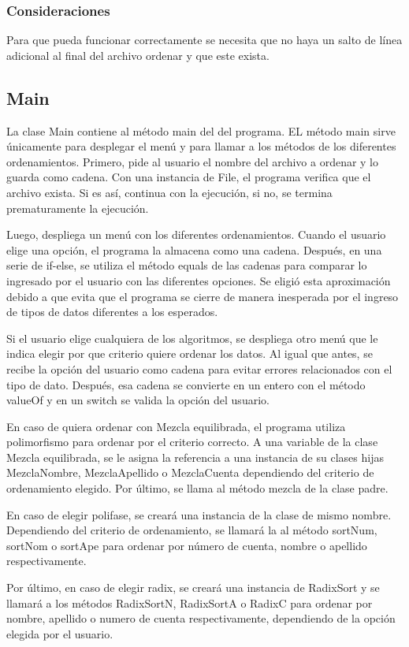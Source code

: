 \documentclass[11pt]{article}
\begin{document}
\subsubsection{Consideraciones}
Para que pueda funcionar correctamente se necesita que no haya un salto de línea adicional al final del archivo ordenar y que este exista. 

\subsection{Main}
La clase Main contiene al método main del del programa. EL método main sirve únicamente para desplegar el menú y para llamar a los métodos de los diferentes ordenamientos. Primero, pide al usuario el nombre del archivo a ordenar y lo guarda como cadena. Con una instancia de File, el programa verifica que el archivo exista. Si es así, continua con la ejecución, si no, se termina prematuramente la ejecución.

 Luego, despliega un menú con los diferentes ordenamientos. Cuando el usuario elige una opción, el programa la almacena como una cadena. Después, en una serie de if-else, se utiliza el método equals de las cadenas para comparar lo ingresado por el usuario con las diferentes opciones. Se eligió esta aproximación debido a que evita que el programa se cierre de manera inesperada por el ingreso de tipos de datos diferentes a los esperados.
\par
Si el usuario elige cualquiera de los algoritmos, se despliega otro menú que le indica elegir por que criterio quiere ordenar los datos. Al igual que antes, se recibe la opción del usuario como cadena para evitar errores relacionados con el tipo de dato. Después, esa cadena se convierte en un entero con el método valueOf y en un switch se valida la opción del usuario. 
\par
En caso de quiera ordenar con Mezcla equilibrada, el programa utiliza polimorfismo para ordenar por el criterio correcto. A una variable de la clase Mezcla equilibrada, se le asigna la referencia a una instancia de su clases hijas MezclaNombre, MezclaApellido o MezclaCuenta dependiendo del criterio de ordenamiento elegido. Por último, se llama al método mezcla de la clase padre.
\par
En caso de elegir polifase, se creará una instancia de la clase de mismo nombre. Dependiendo del criterio de ordenamiento, se llamará la al método sortNum, sortNom o sortApe para ordenar por número de cuenta, nombre o apellido respectivamente.
\par
Por último, en caso de elegir radix, se creará una instancia de RadixSort y se llamará a los métodos RadixSortN, RadixSortA o RadixC para ordenar por nombre, apellido o numero de cuenta respectivamente, dependiendo de la opción elegida por el usuario.
\end{document}
